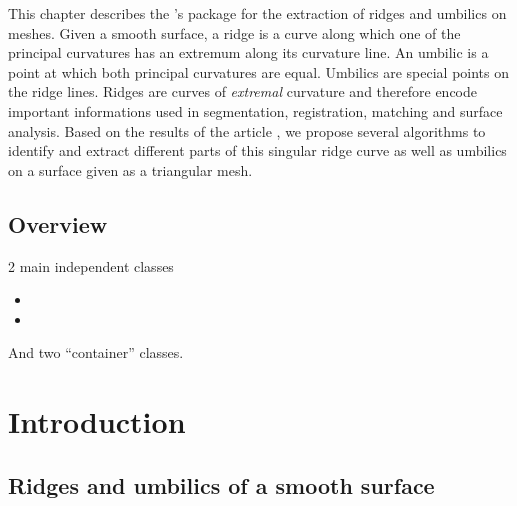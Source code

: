 
\newtheorem{definition}{Definition.}


This chapter describes the \cgal's package for the extraction of
ridges and umbilics on meshes.  Given a smooth surface, a ridge is a
curve along which one of the principal curvatures has an extremum
along its curvature line. An umbilic is a point at which both
principal curvatures are equal. Umbilics are special points on the
ridge lines. Ridges are curves of {\em extremal} curvature and
therefore encode important informations used in segmentation,
registration, matching and surface analysis.  Based on the results of
the article
\cite{rr}, we propose several algorithms to identify and extract
different parts of this singular ridge curve as well as umbilics on a
surface given as a triangular mesh.


\subsection{Overview}

2 main independent classes

\begin{itemize}
\item
{}
\item
{}
\end{itemize}

And two ``container'' classes.

\section{Introduction}
\label{sec:intro}

\subsection{Ridges and umbilics of a smooth surface}

